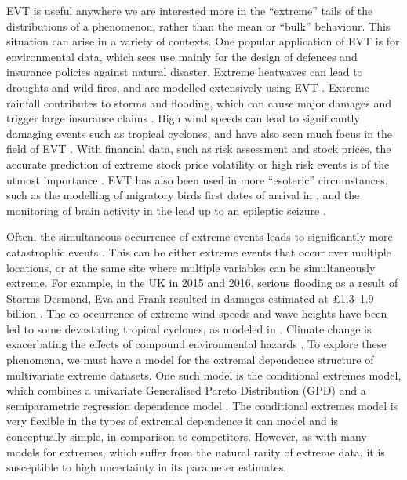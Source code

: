 \documentclass{article}
\numberwithin{equation}{section}
\begin{document}
EVT is useful anywhere we are interested more in the ``extreme'' tails of the distributions of a phenomenon, rather than the mean or ``bulk'' behaviour.
This situation can arise in a variety of contexts.
One popular application of EVT is for environmental data, which sees use mainly for the design of defences and insurance policies against natural disaster.
Extreme heatwaves can lead to droughts and wild fires, and are modelled extensively using EVT \citep{tanarhte2015heat, french2019quantifying, koh2023gradient}.
Extreme rainfall contributes to storms and flooding, which can cause major damages and trigger large insurance claims \citep{Rohrbeck_flooding, osei2021estimation}.
High wind speeds can lead to significantly damaging events such as tropical cyclones, and have also seen much focus in the field of EVT \citep{soukissian2015effect, steinkohl2013extreme}.
With financial data, such as risk assessment and stock prices, the accurate prediction of extreme stock price volatility or high risk events is of the utmost importance \citep{Furio2013, dridi2012monitoring}.
EVT has also been used in more ``esoteric'' circumstances, such as the modelling of migratory birds first dates of arrival in \citet{Koh2024}, and the monitoring of brain activity in the lead up to an epileptic seizure \citet{Karpov2022-xj}.

Often, the simultaneous occurrence of extreme events leads to significantly more catastrophic events \citep{zscheischler2018future, bevacqua2021guidelines}.
This can be either extreme events that occur over multiple locations, or at the same site where multiple variables can be simultaneously extreme.
For example, in the UK in 2015 and 2016, serious flooding as a result of Storms Desmond, Eva and Frank resulted in damages estimated at £1.3–1.9 billion \citep{FloodsWinter, Rohrbeck2021}.
The co-occurrence of extreme wind speeds and wave heights have been led to some devastating tropical cyclones, as modeled in \citet{Sando2022}.
Climate change is exacerbating the effects of compound environmental hazards \citet{AghaKouchak2020-ji}.
To explore these phenomena, we must have a model for the extremal dependence structure of multivariate extreme datasets.
One such model is the conditional extremes model, which combines a univariate Generalised Pareto Distribution (GPD) and a semiparametric regression dependence model \cite{Heffernan2004}.
The conditional extremes model is very flexible in the types of extremal dependence it can model and is conceptually simple, in comparison to competitors.
However, as with many models for extremes, which suffer from the natural rarity of extreme data, it is susceptible to high uncertainty in its parameter estimates. 
\end{document}
